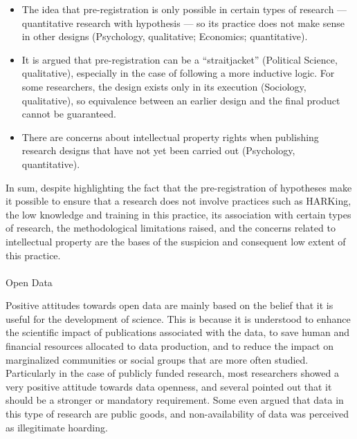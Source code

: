 \documentclass[
  english,
  letterpaper,
]{article}
\makeatletter
\let\oldparagraph\paragraph
\renewcommand{\paragraph}{
    \@ifstar
      \xxxParagraphStar
      \xxxParagraphNoStar
  }
\newcommand{\xxxParagraphStar}[1]{\oldparagraph*{#1}\mbox{}}
\newcommand{\xxxParagraphNoStar}[1]{\oldparagraph{#1}\mbox{}}
\makeatother
\begin{document}
\begin{itemize}
\item
  The idea that pre-registration is only possible in certain types of
  research --- quantitative research with hypothesis --- so its practice
  does not make sense in other designs (Psychology, qualitative;
  Economics; quantitative).
\item
  It is argued that pre-registration can be a ``straitjacket''
  (Political Science, qualitative), especially in the case of following
  a more inductive logic. For some researchers, the design exists only
  in its execution (Sociology, qualitative), so equivalence between an
  earlier design and the final product cannot be guaranteed.
\item
  There are concerns about intellectual property rights when publishing
  research designs that have not yet been carried out (Psychology,
  quantitative).
\end{itemize}

In sum, despite highlighting the fact that the pre-registration of
hypotheses make it possible to ensure that a research does not involve
practices such as HARKing, the low knowledge and training in this
practice, its association with certain types of research, the
methodological limitations raised, and the concerns related to
intellectual property are the bases of the suspicion and consequent low
extent of this practice.

\paragraph{Open Data}\label{open-data}

Positive attitudes towards open data are mainly based on the belief that
it is useful for the development of science. This is because it is
understood to enhance the scientific impact of publications associated
with the data, to save human and financial resources allocated to data
production, and to reduce the impact on marginalized communities or
social groups that are more often studied. Particularly in the case of
publicly funded research, most researchers showed a very positive
attitude towards data openness, and several pointed out that it should
be a stronger or mandatory requirement. Some even argued that data in
this type of research are public goods, and non-availability of data was
perceived as illegitimate hoarding.
\end{document}

